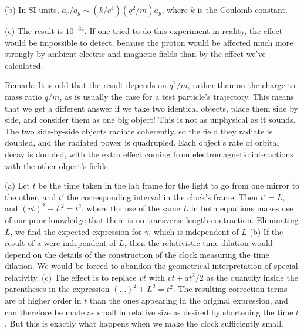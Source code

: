(b) In SI units, $a_r/a_g \sim (k/c^4)(q^2/m)a_g$, where $k$ is the Coulomb constant.

(c) The result is $10^{-34}$. If one tried to do this experiment in reality, the effect would be
impossible to detect, because the proton would be affected much more strongly by ambient electric and
magnetic fields than by the effect we've calculated.

Remark: It is odd that the result depends on $q^2/m$, rather than on the charge-to-mass ratio $q/m$,
as is usually the case for a test particle's trajectory. This means that we get a different answer
if we take two identical objects, place them side by side, and consider them as one big object! This is not as unphysical
as it sounds. The two side-by-side objects radiate coherently, so the field they radiate is doubled, and the
radiated power is quadrupled. Each object's rate of orbital decay is doubled, with the extra effect coming
from electromagnetic interactions with the other object's fields.



(a) Let $t$ be the time taken in the lab frame for the light to go from one mirror to the other,
and $t'$ the corresponding interval in the clock's frame. Then $t'=L$, and $(vt)^2+L^2=t^2$,
where the use of the same $L$ in both equations makes use of our prior knowledge that there
is no transverse length contraction.
Eliminating $L$, we find the expected expression for $\gamma$, which is independent of $L$
(b) If the result of a were independent of $L$, then the relativistic time dilation would depend
on the details of the construction of the clock measuring the time dilation. We would be forced
to abandon the geometrical interpretation of special relativity.
(c) The effect is to replace $vt$ with $vt+at^2/2$ as the quantity inside the parentheses
in the expression $(\ldots)^2+L^2=t^2$. The resulting correction terms are of higher order in
$t$ than the ones appearing in the original expression, and can therefore be made as small
in relative size as desired by shortening the time $t$. But this is exactly what happens when
we make the clock sufficiently small.


